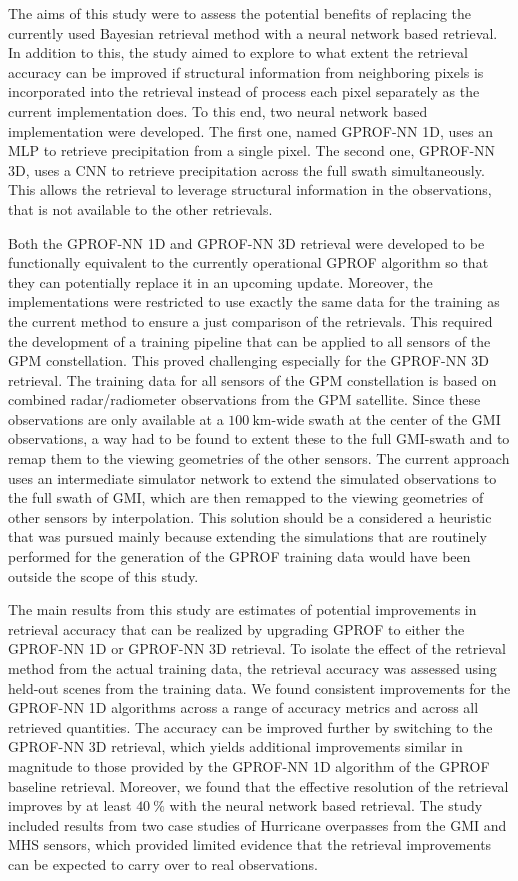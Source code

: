 The aims of this study were to assess the potential benefits of replacing the
currently used Bayesian retrieval method with a neural network based retrieval.
In addition to this, the study aimed to explore to what extent the retrieval
accuracy can be improved if structural information from neighboring pixels is
incorporated into the retrieval instead of process each pixel separately as the
current implementation does. To this end, two neural network based
implementation were developed. The first one, named GPROF-NN 1D, uses an MLP to
retrieve precipitation from a single pixel. The second one, GPROF-NN 3D, uses a
CNN to retrieve precipitation across the full swath simultaneously. This allows
the retrieval to leverage structural information in the observations, that is
not available to the other retrievals.

Both the GPROF-NN 1D and GPROF-NN 3D retrieval were developed to be functionally
equivalent to the currently operational GPROF algorithm so that they can
potentially replace it in an upcoming update. Moreover, the implementations were
restricted to use exactly the same data for the training as the current method
to ensure a just comparison of the retrievals. This required the development of
a training pipeline that can be applied to all sensors of the GPM constellation.
This proved challenging especially for the GPROF-NN 3D retrieval. The training
data for all sensors of the GPM constellation is based on combined
radar/radiometer observations from the GPM satellite. Since these observations
are only available at a $\SI{100}{\kilo \meter}$-wide swath at the center of the
GMI observations, a way had to be found to extent these to the full GMI-swath
and to remap them to the viewing geometries of the other sensors. The current
approach uses an intermediate simulator network to extend the simulated
observations to the full swath of GMI, which are then remapped to the viewing
geometries of other sensors by interpolation. This solution should be a
considered a heuristic that was pursued mainly because extending the simulations
that are routinely performed for the generation of the GPROF training data would
have been outside the scope of this study.

The main results from this study are estimates of potential improvements in
retrieval accuracy that can be realized by upgrading GPROF to either the
GPROF-NN 1D or GPROF-NN 3D retrieval. To isolate the effect of the retrieval
method from the actual training data, the retrieval accuracy was assessed using
held-out scenes from the training data. We found consistent improvements for the
GPROF-NN 1D algorithms across a range of accuracy metrics and across all
retrieved quantities. The accuracy can be improved further by switching to the
GPROF-NN 3D retrieval, which yields additional improvements similar in magnitude
to those provided by the GPROF-NN 1D algorithm of the GPROF baseline retrieval.
Moreover, we found that the effective resolution of the retrieval improves by at
least $\SI{40}{\percent}$ with the neural network based retrieval. The study
included results from two case studies of Hurricane overpasses from the GMI and
MHS sensors, which provided limited evidence that the retrieval improvements can
be expected to carry over to real observations.

